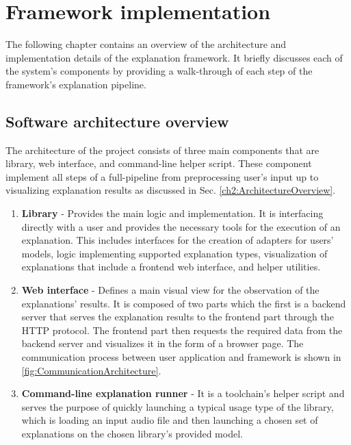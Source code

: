 \documentclass[
    bindingoffset=5mm,  %
    footnoteindent=3mm, %
    hyphenation=true    %
]{src/wut-thesis}
\begin{document}
%
%
\clearpage %
\section{Framework implementation} \label{ch:implementation}

    The following chapter contains an overview of the architecture and implementation details of the explanation framework. It briefly discusses each of the system's components by providing
    a walk-through of each step of the framework's explanation pipeline.

\subsection{Software architecture overview}

    The architecture of the project consists of three main components that are library, web interface, and command-line helper script.
    These component implement all steps of a full-pipeline from preprocessing
    user's input up to visualizing explanation results as discussed in Sec. \ref{ch2:ArchitectureOverview}.

\begin{enumerate}
    \item \textbf{Library} - Provides the main logic and implementation. It is interfacing directly with a user and
    provides the necessary tools for the execution of an explanation. This includes interfaces for the creation of 
    adapters for users' models, logic implementing supported explanation types, visualization of explanations that 
    include a frontend web interface, and helper utilities.

    \item \textbf{Web interface} - Defines a main visual view for the observation of the explanations' results. It is
    composed of two parts which the first is a backend server that serves the explanation results to the frontend part
    through the HTTP protocol. The frontend part then requests the required data from the backend server and visualizes
    it in the form of a browser page. The communication process between user application and framework is shown in
    \ref{fig:CommunicationArchitecture}.

    \item \textbf{Command-line explanation runner} - It is a toolchain's helper script and serves the purpose of quickly 
    launching a typical usage type of the library, which is loading an input audio file and then launching a chosen set 
    of explanations on the chosen library's provided model.
\end{enumerate}
\end{document}
